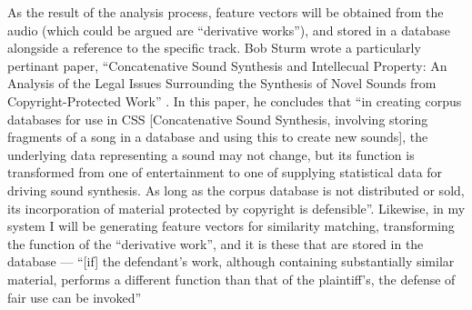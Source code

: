 As the result of the analysis process, feature vectors will be obtained from the
audio (which could be argued are ``derivative works''), and stored in a database
alongside a reference to the specific track. Bob Sturm wrote a particularly
pertinant paper, ``Concatenative Sound Synthesis and Intellecual Property: An
Analysis of the Legal Issues Surrounding the Synthesis of Novel Sounds from
Copyright-Protected Work'' \citep{Sturm2006}. In this paper, he concludes that
``in creating corpus databases for use in CSS [Concatenative Sound
Synthesis, involving storing fragments of a song in a database and
using this to create new sounds], the underlying data representing a
sound may not change, but its function is transformed from one of
entertainment to one of supplying statistical data for driving sound
synthesis. As long as the corpus database is not distributed or sold,
its incorporation of material protected by copyright is defensible''.
Likewise, in my system I will be generating feature vectors for similarity matching, transforming the function of the ``derivative work'', and it is these that are stored in the database — ``[if] the defendant's work, although containing
substantially similar material, performs a different function than that of the
plaintiff's, the defense of fair use can be invoked'' \citep{Copyright1988}
